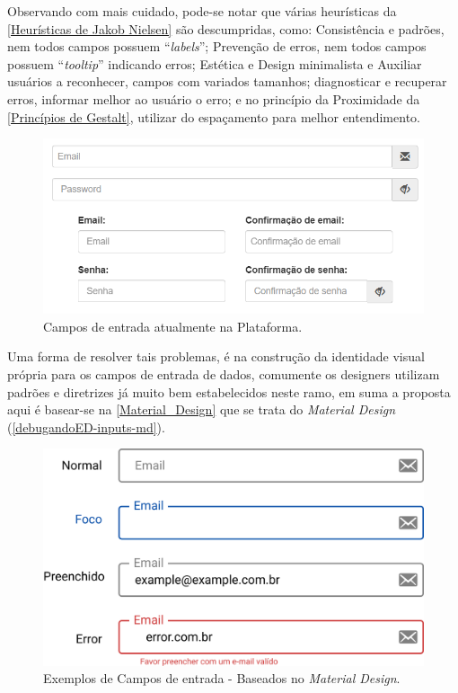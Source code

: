 Observando com mais cuidado, pode-se notar que várias heurísticas da \autoref{Heurísticas de Jakob Nielsen} são descumpridas, como: Consistência e padrões, nem todos campos possuem “\textit{labels}”; Prevenção de erros, nem todos campos possuem “\textit{tooltip}” indicando erros; Estética e Design minimalista e Auxiliar usuários a reconhecer, campos com variados tamanhos; diagnosticar e recuperar erros, informar melhor ao usuário o erro; e no princípio da Proximidade da \autoref{Princípios de Gestalt}, utilizar do espaçamento para melhor entendimento.

\begin{figure}[ht]
    \begin{center}
	    \includegraphics[scale=0.55]{figs/debugandoED-inputs.png}
	\end{center}
    \caption{\label{debugandoED-inputs}Campos de entrada atualmente na Plataforma.}
\end{figure}


Uma forma de resolver tais problemas, é na construção da identidade visual própria para os campos de entrada de dados, comumente os designers utilizam padrões e diretrizes já muito bem estabelecidos neste ramo, em suma a proposta aqui é basear-se na \autoref{Material_Design} que se trata do \textit{Material Design} (\autoref{debugandoED-inputs-md}).

\begin{figure}[ht]
    \begin{center}
	    \includegraphics[scale=0.52]{figs/debugandoED-inputs-md.png}
	\end{center}
    \caption{\label{debugandoED-inputs-md}Exemplos de Campos de entrada - Baseados no \textit{Material Design}.}
\end{figure}

